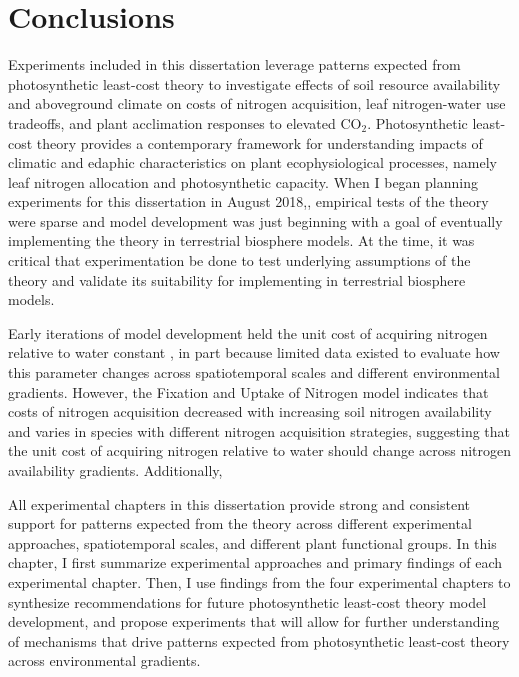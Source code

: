 \chapter{\textbf{Conclusions}}

Experiments included in this dissertation leverage patterns expected from photosynthetic least-cost theory to investigate effects of soil resource availability and aboveground climate on costs of nitrogen acquisition, leaf nitrogen-water use tradeoffs, and plant acclimation responses to elevated CO$_2$. Photosynthetic least-cost theory provides a contemporary framework for understanding impacts of climatic and edaphic characteristics on plant ecophysiological processes, namely leaf nitrogen allocation and photosynthetic capacity. When I began planning experiments for this dissertation in August 2018,, empirical tests of the theory were sparse and model development was just beginning with a goal of eventually implementing the theory in terrestrial biosphere models. At the time, it was critical that experimentation be done to test underlying assumptions of the theory and validate its suitability for implementing in terrestrial biosphere models.

Early iterations of model development held the unit cost of acquiring nitrogen relative to water constant , in part because limited data existed to evaluate how this parameter changes across spatiotemporal scales and different environmental gradients. However, the Fixation and Uptake of Nitrogen model  indicates that costs of nitrogen acquisition decreased with increasing soil nitrogen availability and varies in species with different nitrogen acquisition strategies, suggesting that the unit cost of acquiring nitrogen relative to water should change across nitrogen availability gradients. Additionally, \



All experimental chapters in this dissertation provide strong and consistent support for patterns expected from the theory across different experimental approaches, spatiotemporal scales, and different plant functional groups. In this chapter, I first summarize experimental approaches and primary findings of each experimental chapter. Then, I use findings from the four experimental chapters to synthesize recommendations for future photosynthetic least-cost theory model development, and propose experiments that will allow for further understanding of mechanisms that drive patterns expected from photosynthetic least-cost theory across environmental gradients.